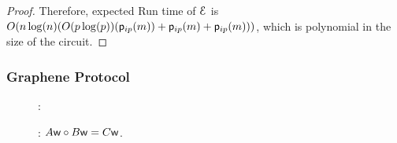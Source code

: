 \begin{proof}
	Therefore, expected Run time of $\mathcal{E}$ is $O(n\log(n)(O(p\log(p))(\mathsf{p}_{ip}(m)) + \mathsf{p}_{ip}(m) + \mathsf{p}_{ip}(m))) $, which is polynomial in the size of the circuit.
\end{proof}

\subsubsection{Graphene Protocol}
\begin{figure}[h!]
	{\footnotesize
		\begin{framed}
			:
			
			: $A\mathsf{w}\circ B\mathsf{w}=C\mathsf{w}$. 
			

\end{framed}}
\end{figure}
